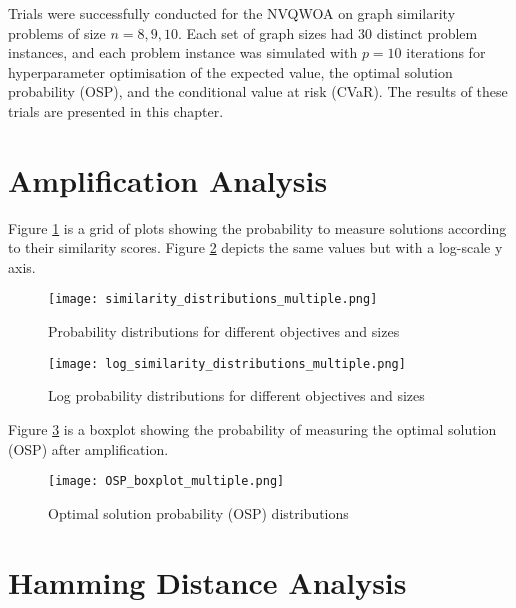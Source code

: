 Trials were successfully conducted for the NVQWOA on graph similarity problems of size $n=8,9,10$. Each set of graph sizes had 30 distinct problem instances, and each problem instance was simulated with $p=10$ iterations for hyperparameter optimisation of the expected value, the optimal solution probability (OSP), and the conditional value at risk (CVaR). The results of these trials are presented in this chapter.

\section{Amplification Analysis}
Figure \ref{fig:similarity dist} is a grid of plots showing the probability to measure solutions according to their similarity scores. Figure \ref{fig:similarity log dist} depicts the same values but with a log-scale y axis.
\begin{figure}[htbp]
    \centering
    \texttt{[image: similarity\_distributions\_multiple.png]} 
    \caption{Probability distributions for different objectives and sizes}
    \label{fig:similarity dist}
\end{figure}

\begin{figure}[htbp]
    \centering
    \texttt{[image: log\_similarity\_distributions\_multiple.png]} 
    \caption{Log probability distributions for different objectives and sizes}
    \label{fig:similarity log dist}
\end{figure}

Figure \ref{fig:osp} is a boxplot showing the probability of measuring the optimal solution (OSP) after amplification.
\begin{figure}[htbp]
    \centering
    \texttt{[image: OSP\_boxplot\_multiple.png]} 
    \caption{Optimal solution probability (OSP) distributions}
    \label{fig:osp}
\end{figure}



\section{Hamming Distance Analysis}


